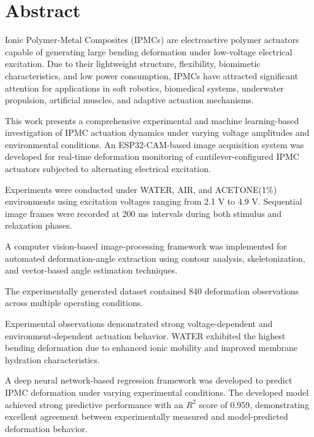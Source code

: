 \documentclass[11pt,a4paper]{article}
\begin{document}
\clearpage
{}


\section*{Abstract}

Ionic Polymer-Metal Composites (IPMCs) are electroactive polymer actuators capable of generating large bending deformation under low-voltage electrical excitation. Due to their lightweight structure, flexibility, biomimetic characteristics, and low power consumption, IPMCs have attracted significant attention for applications in soft robotics, biomedical systems, underwater propulsion, artificial muscles, and adaptive actuation mechanisms.

This work presents a comprehensive experimental and machine learning-based investigation of IPMC actuation dynamics under varying voltage amplitudes and environmental conditions. An ESP32-CAM-based image acquisition system was developed for real-time deformation monitoring of cantilever-configured IPMC actuators subjected to alternating electrical excitation.

Experiments were conducted under WATER, AIR, and ACETONE(1\%) environments using excitation voltages ranging from 2.1 V to 4.9 V. Sequential image frames were recorded at 200 ms intervals during both stimulus and relaxation phases.

A computer vision-based image-processing framework was implemented for automated deformation-angle extraction using contour analysis, skeletonization, and vector-based angle estimation techniques.

The experimentally generated dataset contained 840 deformation observations across multiple operating conditions.

Experimental observations demonstrated strong voltage-dependent and environment-dependent actuation behavior. WATER exhibited the highest bending deformation due to enhanced ionic mobility and improved membrane hydration characteristics.

A deep neural network-based regression framework was developed to predict IPMC deformation under varying experimental conditions. The developed model achieved strong predictive performance with an $R^2$ score of 0.959, demonstrating excellent agreement between experimentally measured and model-predicted deformation behavior.
\end{document}
